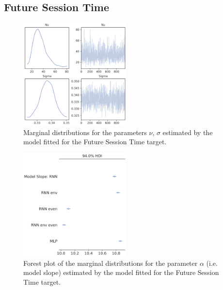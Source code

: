 \subsection{Future Session Time}
\label{future_sess_bayes_3}

\begin{figure}[ht]
\centering
\includegraphics[width=0.5\textwidth]{images/appendix_C/Future Session Time_marginals_3.png}
\caption[\textbf{Future session time marginal distributions}]{Marginal distributions for the parameters $\nu$, $\sigma$ estimated by the model fitted for the Future Session Time target.}
\label{marginals_sess_3}
\end{figure} \FloatBarrier

\begin{figure}[ht]
\centering
\includegraphics[width=0.5\textwidth]{images/appendix_C/Future Session Time_models_3.png}
\caption[\textbf{Future session time model fixed effect}]{Forest plot of the marginal distributions for the parameter $\alpha$ (i.e. model slope) estimated by the model fitted for the Future Session Time target.}
\label{model_sess_3}
\end{figure} \FloatBarrier

